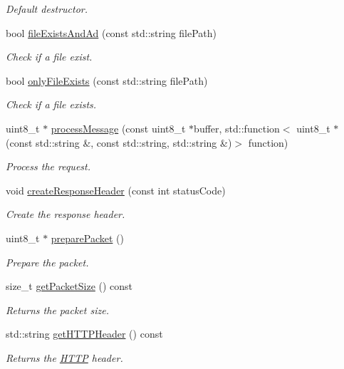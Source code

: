 \begin{DoxyCompactItemize}
\begin{DoxyCompactList}\small\item\em Default destructor. \end{DoxyCompactList}\item 
bool \hyperlink{class_h_t_t_p_a94afb4f469ec4df29cb10bb4cf655ab7}{file\+Exists\+And\+Ad} (const std\+::string file\+Path)
\begin{DoxyCompactList}\small\item\em Check if a file exist. \end{DoxyCompactList}\item 
bool \hyperlink{class_h_t_t_p_aacb832af727973596578a36f99b2b0ed}{only\+File\+Exists} (const std\+::string file\+Path)
\begin{DoxyCompactList}\small\item\em Check if a file exists. \end{DoxyCompactList}\item 
uint8\+\_\+t $\ast$ \hyperlink{class_h_t_t_p_a09f355bae6afff102f966790ad3bde32}{process\+Message} (const uint8\+\_\+t $\ast$buffer, std\+::function$<$ uint8\+\_\+t $\ast$(const std\+::string \&, const std\+::string, std\+::string \&)$>$ function)
\begin{DoxyCompactList}\small\item\em Process the request. \end{DoxyCompactList}\item 
void \hyperlink{class_h_t_t_p_a3c7f21e83e67ec332ae37689f33250a9}{create\+Response\+Header} (const int status\+Code)
\begin{DoxyCompactList}\small\item\em Create the response header. \end{DoxyCompactList}\item 
uint8\+\_\+t $\ast$ \hyperlink{class_h_t_t_p_a301065d4e3cccf7642f2354e50577afb}{prepare\+Packet} ()
\begin{DoxyCompactList}\small\item\em Prepare the packet. \end{DoxyCompactList}\item 
size\+\_\+t \hyperlink{class_h_t_t_p_a597b48ced26a489589ddbd32a14afa0e}{get\+Packet\+Size} () const 
\begin{DoxyCompactList}\small\item\em Returns the packet size. \end{DoxyCompactList}\item 
std\+::string \hyperlink{class_h_t_t_p_adb1e79eb0b52efd8d3d13c37235a6ca8}{get\+H\+T\+T\+P\+Header} () const 
\begin{DoxyCompactList}\small\item\em Returns the \hyperlink{class_h_t_t_p}{H\+T\+TP} header. \end{DoxyCompactList}\end{DoxyCompactItemize}


